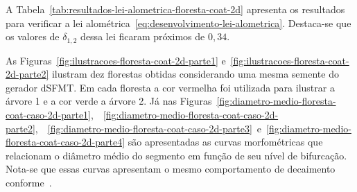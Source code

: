 A Tabela~\ref{tab:resultados-lei-alometrica-floresta-coat-2d} apresenta os resultados 
para verificar a lei alométrica~\eqref{eq:desenvolvimento-lei-alometrica}. Destaca-se que os valores
de $\delta_{1, 2}$ dessa lei ficaram próximos de $0,34$.

As Figuras~\ref{fig:ilustracoes-floresta-coat-2d-parte1} e~\ref{fig:ilustracoes-floresta-coat-2d-parte2} ilustram 
dez florestas obtidas considerando uma mesma semente do gerador dSFMT. Em cada floresta a cor vermelha foi utilizada 
para ilustrar a árvore 1 e a cor verde a árvore 2.
Já nas Figuras~\ref{fig:diametro-medio-floresta-coat-caso-2d-parte1},\ 
~\ref{fig:diametro-medio-floresta-coat-caso-2d-parte2},\ 
~\ref{fig:diametro-medio-floresta-coat-caso-2d-parte3}\ 
e~\ref{fig:diametro-medio-floresta-coat-caso-2d-parte4} são apresentadas 
as curvas morfométricas que relacionam o diâmetro médio 
do segmento em função de seu nível de bifurcação. Nota-se que essas curvas apresentam
o mesmo comportamento de decaimento conforme~\cite{Karch1999}.

\clearpage

